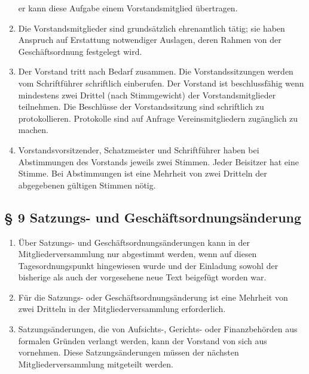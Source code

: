 ﻿\documentclass[10pt,a4paper]{scrartcl}
\begin{document}
\begin{enumerate}
		er kann diese Aufgabe einem Vorstandsmitglied übertragen.
	\item Die Vorstandsmitglieder sind grundsätzlich ehrenamtlich tätig; sie haben Anspruch
		auf Erstattung notwendiger Auslagen, deren Rahmen von der Geschäftsordnung
		festgelegt wird.
    \item Der Vorstand tritt nach Bedarf zusammen. Die Vorstandssitzungen
    werden vom Schriftführer schriftlich einberufen. Der Vorstand ist
    beschlussfähig wenn mindestens zwei Drittel (nach Stimmgewicht) der Vorstandsmitglieder
    teilnehmen. Die Beschlüsse der Vorstandssitzung sind schriftlich zu
    protokollieren. Protokolle sind auf Anfrage Vereinsmitgliedern zugänglich zu machen.
    \item Vorstandsvorsitzender, Schatzmeister und Schriftführer haben bei
    Abstimmungen des Vorstands jeweils zwei Stimmen. Jeder Beisitzer hat eine
    Stimme. Bei Abstimmungen ist eine Mehrheit von zwei Dritteln der
    abgegebenen gültigen Stimmen nötig.
\end{enumerate}
%
%
\subsection*{§ 9 Satzungs- und Geschäftsordnungsänderung}
\begin{enumerate}
	\item Über Satzungs- und Geschäftsordnungsänderungen kann in der Mitgliederversammlung
		nur abgestimmt werden, wenn auf diesen Tagesordnungspunkt hingewiesen wurde und der
		Einladung sowohl der bisherige als auch der vorgesehene neue Text beigefügt
		worden war.
	\item Für die Satzungs- oder Geschäftsordnungsänderung ist eine Mehrheit von zwei
		Dritteln in der Mitgliederversammlung erforderlich.
	\item Satzungsänderungen, die von Aufsichts-, Gerichts- oder Finanz\-be\-hör\-den aus formalen
		Grün\-den verlangt werden, kann der Vorstand von sich aus vornehmen. Diese
		Sat\-zungs\-än\-der\-ung\-en müs\-sen der nächs\-ten Mitgliederversammlung mitgeteilt
		werden.
\end{enumerate}
%
%
\end{document}
